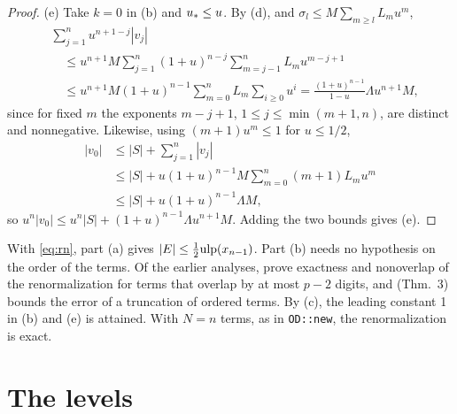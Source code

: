 \begin{proof}
(e) Take $k = 0$ in (b) and $u_{*} \le u$. By (d), and $\sigma_l \le M\sum_{m \ge l} L_m u^m$,
\begin{align*}
&\sum_{j=1}^n u^{n+1-j}|v_j| \\
&\quad\le u^{n+1}M\sum_{j=1}^n (1+u)^{n-j}\sum_{m=j-1}^{n} L_m u^{m-j+1} \\
&\quad\le u^{n+1}M(1+u)^{n-1}\sum_{m=0}^n L_m \sum_{i \ge 0} u^i = \frac{(1+u)^{n-1}}{1-u}\Lambda u^{n+1}M,
\end{align*}
since for fixed $m$ the exponents $m - j + 1$, $1 \le j \le \min(m+1, n)$, are distinct and nonnegative. Likewise,
using $(m+1)u^m \le 1$ for $u \le 1/2$,
\begin{align*}
|v_0| &\le |S| + \sum_{j=1}^n |v_j| \\
&\le |S| + u(1+u)^{n-1}M\sum_{m=0}^n (m+1)L_m u^m \\
&\le |S| + u(1+u)^{n-1}\Lambda M,
\end{align*}
so $u^n|v_0| \le u^n|S| + (1+u)^{n-1}\Lambda u^{n+1}M$. Adding the two bounds gives (e).
\end{proof}

\begin{remark}
With \eqref{eq:rn}, part (a) gives $|E| \le \frac12\mathrm{ulp}(x_{n-1})$. Part (b) needs no hypothesis on the order of the
terms. Of the earlier analyses, \cite{JMMP16,BJMP17} prove exactness and nonoverlap of the renormalization for terms
that overlap by at most $p-2$ digits, and \cite{FMP19} (Thm.~3) bounds the error of a truncation of ordered terms. By
(c), the leading constant 1 in (b) and (e) is attained. With $N = n$ terms, as in
\texttt{OD::new}, the renormalization is exact.
\end{remark}

\section{The levels}

